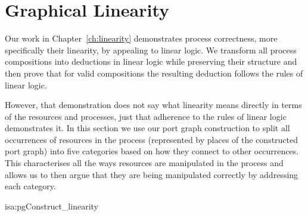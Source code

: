 \documentclass[class=smolathesis,crop=false]{standalone}
\begin{document}
\section{Graphical Linearity}
\label{sec:port_graphs/linearity}

Our work in Chapter~\ref{ch:linearity} demonstrates process correctness, more specifically their linearity, by appealing to linear logic.
We transform all process compositions into deductions in linear logic while preserving their structure and then prove that for valid compositions the resulting deduction follows the rules of linear logic.

However, that demonstration does not say what linearity means directly in terms of the resources and processes, just that adherence to the rules of linear logic demonstrates it.
In this section we use our port graph construction to split all occurrences of resources in the process (represented by places of the constructed port graph) into five categories based on how they connect to other occurrences.
This characterises all the ways resources are manipulated in the process and allows us to then argue that they are being manipulated correctly by addressing each category.

\pagebreak
\begin{isalemma}{isa:pgConstruct_linearity}
  
\end{isalemma}
\end{document}
